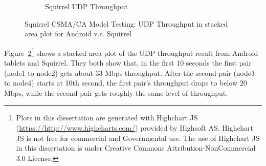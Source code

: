 \documentclass[12pt]{report}
\begin{document}
\begin{figure}[h]
\begin{center}
\begin{subfigure}[h]{\textwidth}
    \end{subfigure}
    \begin{subfigure}[h]{\textwidth}
      \caption{\label{fig:squirrel_preliminary_squirrel}Squirrel UDP Throughput}
    \end{subfigure}
    \caption{\label{fig:squirrel_preliminary}Squirrel CSMA/CA Model Testing: UDP Throughput in stacked area plot for Android v.s. Squirrel}
  \end{center}
\end{figure}

Figure~\ref{fig:squirrel_preliminary}\footnote{Plots in this dissertation are generated with Highchart JS (\url{https://http://www.highcharts.com/}) provided by Highsoft AS. Highchart JS is not free for commercial and Governmental use. The use of Highchart JS in this dissertation is under Creative Commons Attribution-NonCommercial 3.0 License.} shows a stacked area plot of the UDP throughput result from Android tablets and Squirrel. They both show that, in the first 10 seconds the first pair (node1 to node2) gets about 33 Mbps throughput. After the second pair (node3 to node4) starts at 10th second, the first pair's throughput drops to below 20 Mbps, while the second pair gets roughly the same level of throughput.
\end{document}
